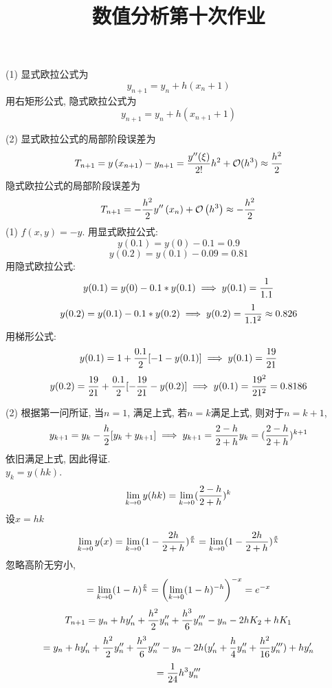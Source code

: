\documentclass[UTF8,9pt]{ctexart}
\title{数值分析第十次作业}
\begin{document}
 
\maketitle
{}
(1) 显式欧拉公式为$$ 
y_{n+1}=y_{n}+h (x_n+1)
 $$
用右矩形公式, 隐式欧拉公式为$$ 
 y_{n+1}=y_{n}+h (x_{n+1}+1)
  $$

(2) 显式欧拉公式的局部阶段误差为
$$ 
T_{n+1}=y\left(x_{n+1}\right)-y_{n+1}=\frac{y^{\prime \prime}(\xi)}{2 !} h^{2} +\mathcal{O}(h^{3})\approx \frac{h^2}{2}
 $$
 隐式欧拉公式的局部阶段误差为
 $$ 
 T_{n+1}=-\frac{h^{2}}{2} y^{\prime \prime}\left(x_{n}\right)+\mathcal{O}\left(h^{3}\right) \approx -\frac{h^2}{2}
  $$
(1) $f(x,y)=-y$. 
用显式欧拉公式:
$$y(0.1) = y(0)-0.1 = 0.9$$
$$y(0.2) = y(0.1) -0.09 = 0.81$$
用隐式欧拉公式: 
$$y(0.1) = y(0) - 0.1*y(0.1) \implies y(0.1) = \frac{1}{1.1}$$
$$y(0.2) = y(0.1) - 0.1*y(0.2) \implies y(0.2) = \frac{1}{1.1^2}\approx0.826$$
用梯形公式: 
$$y(0.1) = 1+\frac{0.1}{2}[-1-y(0.1)] \implies y(0.1) = \frac{19}{21}$$
$$y(0.2) = \frac{19}{21}+\frac{0.1}{2}[-\frac{19}{21}-y(0.2)] \implies y(0.1) = \frac{19^2}{21^2} = 0.8186$$

(2) 根据第一问所证, 当$n=1$, 满足上式, 若$n=k$满足上式, 则对于$n=k+1$,
$$y_{k+1} = y_k-\frac{h}{2}[y_k+y_{k+1}]\implies y_{k+1} = \frac{2-h}{2+h}y_k = (\frac{2-h}{2+h})^{k+1}$$
依旧满足上式, 因此得证. \\
$y_k = y(hk)$. 
$$\lim_{k\to 0} y(hk) = \lim_{k\to 0} (\frac{2-h}{2+h})^{k} $$
设$x=hk$
$$\lim_{k\to 0} y(x) = \lim_{k\to 0} (1-\frac{2h}{2+h})^{\frac{x}{h}}  = \lim_{k\to 0} (1-\frac{2h}{2+h})^{\frac{x}{h}}$$
忽略高阶无穷小, 
$$= \lim_{k\to 0} (1-h)^{\frac{x}{h}} = \left( \lim_{k\to 0} (1-h)^{-{h}} \right)^{-x}=e^{-x}$$
$$T_{n+1} = y_n+hy'_n+\frac{h^2}{2}y''_n+\frac{h^3}{6}y'''_n-y_n-2hK_2+hK_1$$
$$= y_n+hy'_n+\frac{h^2}{2}y''_n+\frac{h^3}{6}y'''_n-y_n-2h(y'_n+\frac{h}{4}y''_n+\frac{h^2}{16}y'''_n)+hy'_n$$
$$=\frac{1}{24}h^3y'''_n$$
\end{document}
